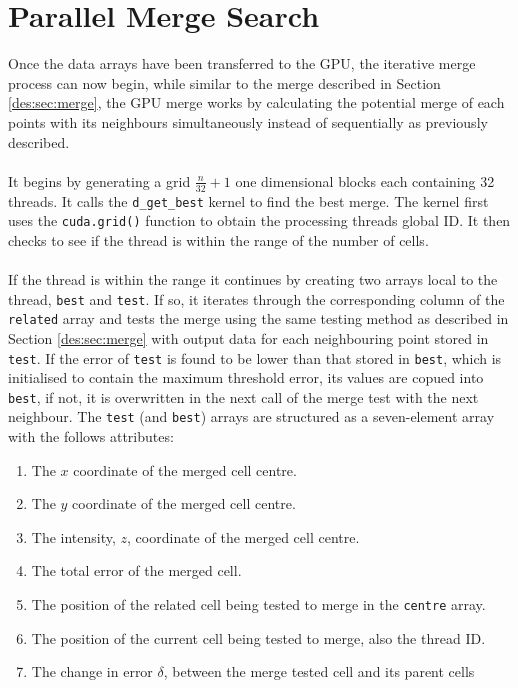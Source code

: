 \section{Parallel Merge Search}
Once the data arrays have been transferred to the GPU, the iterative merge process can now begin, while similar to the merge described in Section \ref{des:sec:merge}, the GPU merge works by calculating the potential merge of each points with its neighbours simultaneously instead of sequentially as previously described.
\\
\\
It begins by generating a grid $\frac{n}{32}+1$ one dimensional blocks each containing 32 threads. It calls the \texttt{d\_get\_best} kernel to find the best merge. The kernel first uses the \texttt{cuda.grid()} function to obtain the processing threads global ID. It then checks to see if the thread is within the range of the number of cells.
\\
\\
If the thread is within the range it continues by creating two arrays local to the thread, \texttt{best} and \texttt{test}. If so, it iterates through the corresponding column of the \texttt{related} array and tests the merge using the same testing method as described in Section \ref{des:sec:merge} with output data for each neighbouring point stored in \texttt{test}. If the error of \texttt{test} is found to be lower than that stored in \texttt{best}, which is initialised to contain the maximum threshold error, its values are copued into \texttt{best}, if not, it is overwritten in the next call of the merge test with the next neighbour. The \texttt{test} (and \texttt{best}) arrays are structured as a seven-element array with the follows attributes:
\begin{enumerate}
\item The $x$ coordinate of the merged cell centre.
\item The $y$ coordinate of the merged cell centre.
\item The intensity, $z$, coordinate of the merged cell centre.
\item The total error of the merged cell.
\item The position of the related cell being tested to merge in the \texttt{centre} array.
\item The position of the current cell being tested to merge, also the thread ID.
\item The change in error $\delta$, between the merge tested cell and its parent cells
\end{enumerate}
